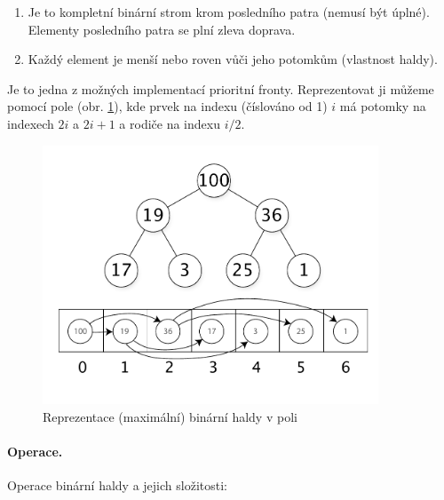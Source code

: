 \begin{enumerate}[itemsep=0pt, topsep=2pt]
    \item Je to kompletní binární strom krom posledního patra (nemusí být úplné). Elementy posledního patra se plní zleva doprava.
    \item Každý element je menší nebo roven vůči jeho potomkům (vlastnost haldy).
\end{enumerate}

\noindent Je to jedna z možných implementací prioritní fronty. Reprezentovat ji můžeme pomocí pole (obr. \ref{fig:heap_array_representation}), kde prvek na indexu (číslováno od 1) $i$ má potomky na indexech $2i$ a $2i + 1$ a rodiče na indexu $i/2$.

\begin{figure}[htbp]
    \begin{center}
        \vspace{-20px}
        \includegraphics[width=100mm]{spolecne/01/images/Max-Heap}
        \vspace{-20px}
        \caption{Reprezentace (maximální) binární haldy v poli}
        \label{fig:heap_array_representation}
        \vspace{-20px}
    \end{center}
\end{figure}

\paragraph{Operace.} Operace binární haldy a jejich složitosti:

